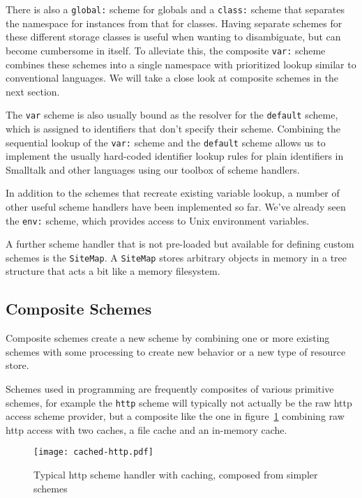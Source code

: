 \documentclass[preprint,authoryear]{llncs}
\begin{document}
There is also a {\tt global:} scheme for globals and a {\tt class:} scheme that separates
the namespace for instances from that for classes.  Having separate schemes for
these different storage classes is useful when wanting to disambiguate,
but can become cumbersome in itself.  To alleviate this, the composite
{\tt var:} scheme combines these schemes into a single namespace
with prioritized lookup similar to conventional languages.  We will take
a close look at composite schemes in the next section.  

The {\tt var} scheme is also usually bound as the resolver for the {\tt default}
scheme, which is assigned to identifiers that don't specify their scheme.
Combining the sequential lookup of the {\tt var:} scheme and the {\tt default}
scheme allows us to implement the usually hard-coded identifier lookup
rules for plain identifiers in Smalltalk and other languages using
our toolbox of scheme handlers.

In addition to the schemes that recreate existing variable lookup, a number
of other useful scheme handlers have been implemented so far.  We've
already seen the {\tt env:} scheme, which provides access to Unix
environment variables.  

A further scheme handler that is not pre-loaded but available for defining
custom schemes is the {\tt SiteMap}.  A {\tt SiteMap} stores arbitrary objects
in memory in a tree structure that acts a bit like a memory filesystem.

\subsection{Composite Schemes}
\label{compositeSchemes}
Composite schemes  create a new scheme by combining one or 
more existing schemes with some processing to create new behavior
or a new type of resource store. 

 Schemes used in programming 
are frequently composites of various primitive schemes, for example
the {\tt http} scheme will typically not actually be the raw http access
scheme provider, but a composite like the one in figure~\ref{fig:http-cached} combining
raw http access with two caches, a file cache and an in-memory cache.


\begin{figure}[htbp]
\begin{center}
\texttt{[image: cached-http.pdf]}
\caption{Typical http scheme handler with caching, composed from simpler schemes}
\label{fig:http-cached}
\end{center}
\end{figure}
\end{document}
